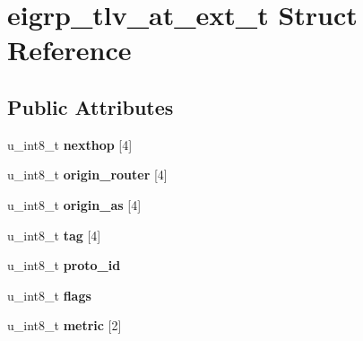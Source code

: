 \hypertarget{structeigrp__tlv__at__ext__t}{
\section{eigrp\_\-tlv\_\-at\_\-ext\_\-t Struct Reference}
\label{structeigrp__tlv__at__ext__t}
}
\subsection*{Public Attributes}
\begin{DoxyCompactItemize}
\item 
\hypertarget{structeigrp__tlv__at__ext__t_a5be0375d58d74d2846b64178a9afcb60}{
u\_\-int8\_\-t {\bfseries nexthop} \mbox{[}4\mbox{]}}
\label{structeigrp__tlv__at__ext__t_a5be0375d58d74d2846b64178a9afcb60}

\item 
\hypertarget{structeigrp__tlv__at__ext__t_ad19961dd865a189391b2ff6482ce2b53}{
u\_\-int8\_\-t {\bfseries origin\_\-router} \mbox{[}4\mbox{]}}
\label{structeigrp__tlv__at__ext__t_ad19961dd865a189391b2ff6482ce2b53}

\item 
\hypertarget{structeigrp__tlv__at__ext__t_aa1b6862f421cc94738d7d437748912d4}{
u\_\-int8\_\-t {\bfseries origin\_\-as} \mbox{[}4\mbox{]}}
\label{structeigrp__tlv__at__ext__t_aa1b6862f421cc94738d7d437748912d4}

\item 
\hypertarget{structeigrp__tlv__at__ext__t_a95103541cfe0a8eb983ba95f8c45afba}{
u\_\-int8\_\-t {\bfseries tag} \mbox{[}4\mbox{]}}
\label{structeigrp__tlv__at__ext__t_a95103541cfe0a8eb983ba95f8c45afba}

\item 
\hypertarget{structeigrp__tlv__at__ext__t_a2e0a399ad65b1ddf0e4877c4d32418f7}{
u\_\-int8\_\-t {\bfseries proto\_\-id}}
\label{structeigrp__tlv__at__ext__t_a2e0a399ad65b1ddf0e4877c4d32418f7}

\item 
\hypertarget{structeigrp__tlv__at__ext__t_a46d5a61e72908ea1b751bce85c3cd2d6}{
u\_\-int8\_\-t {\bfseries flags}}
\label{structeigrp__tlv__at__ext__t_a46d5a61e72908ea1b751bce85c3cd2d6}

\item 
\hypertarget{structeigrp__tlv__at__ext__t_a486e8c23849d747e8bc6f40de57a2a5b}{
u\_\-int8\_\-t {\bfseries metric} \mbox{[}2\mbox{]}}
\label{structeigrp__tlv__at__ext__t_a486e8c23849d747e8bc6f40de57a2a5b}


\end{DoxyCompactItemize}
